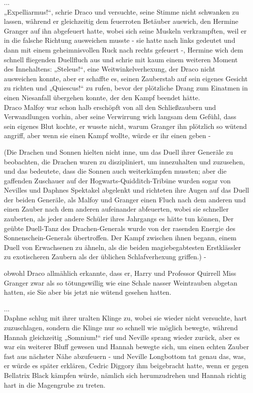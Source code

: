 {...\\ „Expelliarmus!“, schrie Draco und versuchte, seine Stimme nicht schwanken zu lassen, während er gleichzeitig dem feuerroten Betäuber auswich, den Hermine Granger auf ihn abgefeuert hatte, wobei sich seine Muskeln verkrampften, weil er in die falsche Richtung ausweichen musste - sie hatte nach links gedeutet und dann mit einem geheimnisvollen Ruck nach rechts gefeuert -, Hermine wich dem schnell fliegenden Duellfluch aus und schrie mit kaum einem weiteren Moment des Innehaltens: „Steleus!“, eine Weitwinkelverhexung, der Draco nicht ausweichen konnte, aber er schaffte es, seinen Zauberstab auf sein eigenes Gesicht zu richten und „Quiescus!“ zu rufen, bevor der plötzliche Drang zum Einatmen in einen Niesanfall übergehen konnte, der den Kampf beendet hätte.\\ Draco Malfoy war schon halb erschöpft von all den Schließzaubern und Verwandlungen vorhin, aber seine Verwirrung wich langsam dem Gefühl, dass sein eigenes Blut kochte, er wusste nicht, warum Granger ihn plötzlich so wütend angriff, aber wenn sie einen Kampf wollte, würde er ihr einen geben -

(Die Drachen und Sonnen hielten nicht inne, um das Duell ihrer Generäle zu beobachten, die Drachen waren zu diszipliniert, um innezuhalten und zuzusehen, und das bedeutete, dass die Sonnen auch weiterkämpfen mussten; aber die gaffenden Zuschauer auf der Hogwarts-Quidditch-Tribüne wurden sogar von Nevilles und Daphnes Spektakel abgelenkt und richteten ihre Augen auf das Duell der beiden Generäle, als Malfoy und Granger einen Fluch nach dem anderen und einen Zauber nach dem anderen aufeinander abfeuerten, wobei sie schneller zauberten, als jeder andere Schüler ihres Jahrgangs es hätte tun können, Der geübte Duell-Tanz des Drachen-Generals wurde von der rasenden Energie des Sonnenschein-Generals übertroffen. Der Kampf zwischen ihnen begann, einem Duell von Erwachsenen zu ähneln, als die beiden magiebegabtesten Erstklässler zu exotischeren Zaubern als der üblichen Schlafverhexung griffen.) -

obwohl Draco allmählich erkannte, dass er, Harry und Professor Quirrell Miss Granger zwar als so tötungswillig wie eine Schale nasser Weintrauben abgetan hatten, sie Sie aber bis jetzt nie wütend gesehen hatten.

...\\ Daphne schlug mit ihrer uralten Klinge zu, wobei sie wieder nicht versuchte, hart zuzuschlagen, sondern die Klinge nur so schnell wie möglich bewegte, während Hannah gleichzeitig „Somnium!“ rief und Neville sprang wieder zurück, aber es war ein weiterer Bluff gewesen und Hannah bewegte sich, um einen echten Zauber fast aus nächster Nähe abzufeuern - und Neville Longbottom tat genau das, was, er würde es später erklären, Cedric Diggory ihm beigebracht hatte, wenn er gegen Bellatrix Black kämpfen würde, nämlich sich herumzudrehen und Hannah richtig hart in die Magengrube zu treten.

}
